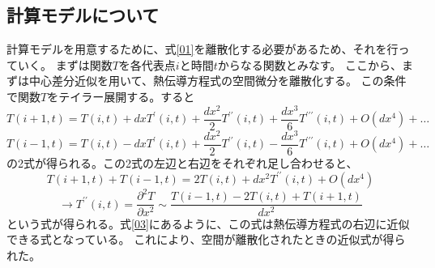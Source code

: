 \documentclass{jsarticle}
\begin{document}
\subsection{計算モデルについて}
計算モデルを用意するために、式\ref{01}を離散化する必要があるため、それを行っていく。
まずは関数$T$を各代表点$i$と時間$t$からなる関数とみなす。
ここから、まずは中心差分近似を用いて、熱伝導方程式の空間微分を離散化する。
この条件で関数$T$をテイラー展開する。すると
\begin{equation}
	T(i+1,t) = T(i,t) + dxT^{\prime}(i,t) + \frac{dx^2}{2}T^{\prime\prime}(i,t) + \frac{dx^3}{6}T^{\prime\prime\prime}(i,t) + O(dx^4) + \ldots
\end{equation}
\begin{equation}
	T(i-1,t) = T(i,t) - dxT^{\prime}(i,t) + \frac{dx^2}{2}T^{\prime\prime}(i,t) - \frac{dx^3}{6}T^{\prime\prime\prime}(i,t) + O(dx^4) + \ldots
\end{equation}
の2式が得られる。この2式の左辺と右辺をそれぞれ足し合わせると、
\begin{equation}
	T(i+1,t) + T(i-1,t) = 2T(i,t) + dx^{2}T^{\prime\prime}(i,t) + O(dx^4)
\end{equation}
\begin{equation}
	\rightarrow T^{\prime\prime}(i,t) = \frac{{\partial}^{2} T}{\partial x^2} \sim \frac{T(i-1,t) - 2T(i,t) +T(i+1,t)}{dx^2} \label{03}
\end{equation}
という式が得られる。式\ref{03}にあるように、この式は熱伝導方程式の右辺に近似できる式となっている。
これにより、空間が離散化されたときの近似式が得られた。
\end{document}
